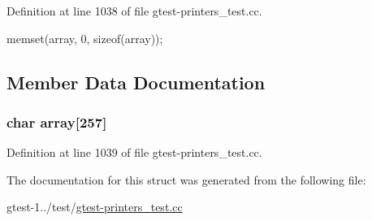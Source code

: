 \-Definition at line 1038 of file gtest-\/printers\-\_\-test.\-cc.


\begin{DoxyCode}
{ memset(array, 0, sizeof(array)); }
\end{DoxyCode}


\subsection{\-Member \-Data \-Documentation}
\hypertarget{structtesting_1_1gtest__printers__test_1_1Big_a24a18e5822e707caef36d51c71678269}{
\subsubsection[{array}]{\setlength{\rightskip}{0pt plus 5cm}char {\bf array}\mbox{[}257\mbox{]}}}\label{d9/d3c/structtesting_1_1gtest__printers__test_1_1Big_a24a18e5822e707caef36d51c71678269}


\-Definition at line 1039 of file gtest-\/printers\-\_\-test.\-cc.



\-The documentation for this struct was generated from the following file\-:\begin{DoxyCompactItemize}
\item 
gtest-\/1../test/\hyperlink{gtest-printers__test_8cc}{gtest-\/printers\-\_\-test.\-cc}\end{DoxyCompactItemize}
